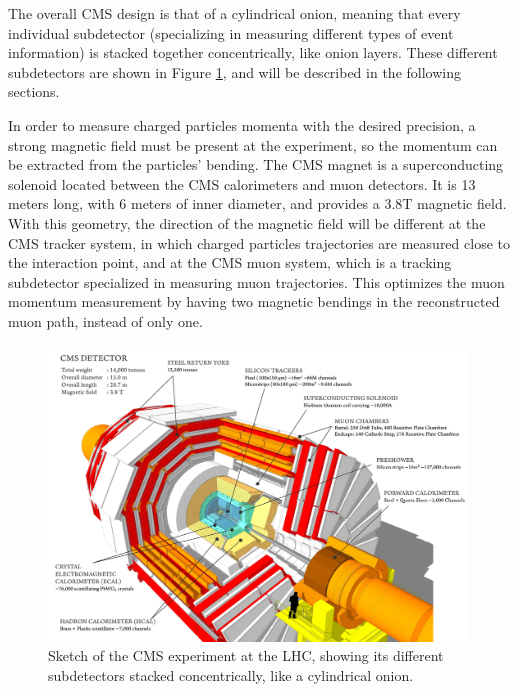 The overall CMS design is that of a cylindrical onion, meaning that every individual subdetector (specializing in measuring different types of event information) is stacked together concentrically, like onion layers. 
These different subdetectors are shown in Figure \ref{fig:cms_sketch}, and will be described in the following sections. 

In order to measure charged particles momenta with the desired precision, a strong magnetic field must be present at the experiment, so the momentum can be extracted from the particles' bending. 
The CMS magnet is a superconducting solenoid located between the CMS calorimeters and muon detectors. 
It is 13 meters long, with 6 meters of inner diameter, and provides a 3.8T magnetic field. 
With this geometry, the direction of the magnetic field will be different at the CMS tracker system, in which charged particles trajectories are measured close to the interaction point, and at the CMS muon system, which is a tracking subdetector specialized in measuring muon trajectories. 
This optimizes the muon momentum measurement by having two magnetic bendings in the reconstructed muon path, instead of only one. 

\begin{figure}[h]
\centering 
\includegraphics[width=0.99\textwidth]{figures/cms_sketch}\hfil
\caption{Sketch of the CMS experiment at the LHC, showing its different subdetectors stacked concentrically, like a cylindrical onion. }
\label{fig:cms_sketch}
\end{figure}


